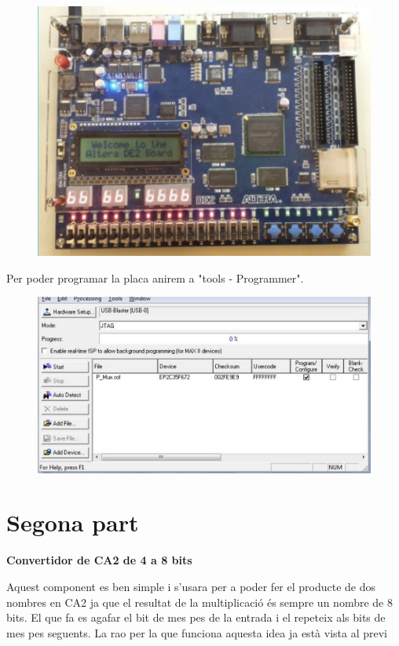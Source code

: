 \documentclass[12pt, a4papre]{article}
\begin{document}
	\begin{figure}[H]
		\begin{center}
		\includegraphics[width=150mm]{placa.jpeg}
		\end{center}
	\end{figure}
	
	
	Per poder programar la placa anirem a "tools - Programmer".
	\begin{figure}[H]
		\begin{center}
		\includegraphics[width=150mm]{programacioplaca1.jpeg}
		\end{center}
	\end{figure}
	
	\newpage
	\section{Segona part}
	\textbf{\large{Convertidor de CA2 de 4 a 8 bits}}
	
	Aquest component es ben simple i s'usara per a poder fer el producte de dos nombres en CA2 ja que el resultat de la multiplicació és sempre un nombre de 8 bits. El que fa es agafar el bit de mes pes de la entrada i el repeteix als bits de mes pes seguents. La rao per la que funciona aquesta idea ja està vista al previ
	
\end{document}
